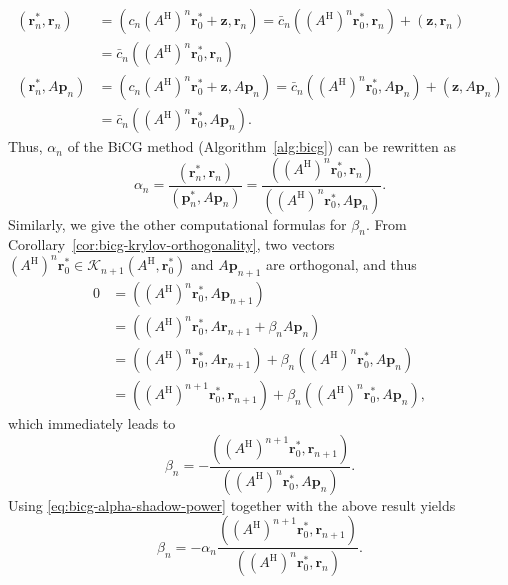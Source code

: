 \[\begin{aligned}(\bm r_n^{*},\bm r_n)&=(c_n(A^{\mathrm H})^n\bm r_0^{*}+\bm z,\bm r_n)=\bar c_n((A^{\mathrm H})^n\bm r_0^{*},\bm r_n)+(\bm z,\bm r_n)\\&=\bar c_n((A^{\mathrm H})^n\bm r_0^{*},\bm r_n)\\
(\bm r_n^{*},A\bm p_n)&=(c_n(A^{\mathrm H})^n\bm r_0^{*}+\bm z,A\bm p_n)=\bar c_n((A^{\mathrm H})^n\bm r_0^{*},A\bm p_n)+(\bm z,A\bm p_n)\\&=\bar c_n((A^{\mathrm H})^n\bm r_0^{*},A\bm p_n).
\end{aligned}\]
{Thus, $\alpha_n$ of the BiCG method (Algorithm\ \ref{alg:bicg}) can be rewritten as}
\begin{equation}\label{eq:bicg-alpha-shadow-power}\alpha_n=\frac{(\bm r_n^{*},\bm r_n)}{(\bm p_n^{*},A\bm p_n)}=\frac{((A^{\mathrm H})^n\bm r_0^{*},\bm r_n)}{((A^{\mathrm H})^n\bm r_0^{*},A\bm p_n)}.\end{equation}
{Similarly, we give the other computational formulas for $\beta_n$. From Corollary\ \ref{cor:bicg-krylov-orthogonality}, two vectors $(A^{\mathrm H})^n\bm r_0^{*}\in\mathcal K_{n+1}(A^{\mathrm H},\bm r_0^{*})$ and $A\bm p_{n+1}$ are orthogonal, and thus}
\[\begin{aligned}0&=((A^{\mathrm H})^n\bm r_0^{*},A\bm p_{n+1})\\&=((A^{\mathrm H})^n\bm r_0^{*},A\bm r_{n+1}+\beta_nA\bm p_n)\\&=((A^{\mathrm H})^n\bm r_0^{*},A\bm r_{n+1})+\beta_n((A^{\mathrm H})^n\bm r_0^{*},A\bm p_n)\\&=((A^{\mathrm H})^{n+1}\bm r_0^{*},\bm r_{n+1})+\beta_n((A^{\mathrm H})^n\bm r_0^{*},A\bm p_n),\end{aligned}\]
{which immediately leads to}
\[\beta_n=-\frac{((A^{\mathrm H})^{n+1}\bm r_0^{*},\bm r_{n+1})}{((A^{\mathrm H})^n\bm r_0^{*},A\bm p_n)}.\]
{Using \eqref{eq:bicg-alpha-shadow-power} together with the above result yields}
\begin{equation}\label{eq:bicg-beta-shadow-power}\beta_n=-\alpha_n\frac{((A^{\mathrm H})^{n+1}\bm r_0^{*},\bm r_{n+1})}{((A^{\mathrm H})^n\bm r_0^{*},\bm r_n)}.\end{equation}
